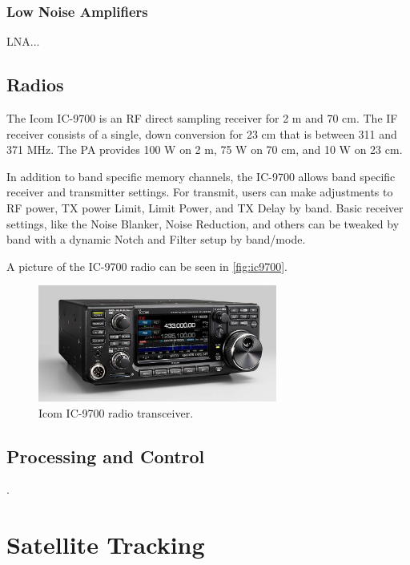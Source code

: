 \subsubsection{Low Noise Amplifiers}

LNA...

\subsection{Radios}

The Icom IC-9700 \cite{ic9700} is an RF direct sampling receiver for 2 m and 70 cm. The IF receiver consists of a single, down conversion for 23 cm that is between 311 and 371 MHz. The PA provides 100 W on 2 m, 75 W on 70 cm, and 10 W on 23 cm.

In addition to band specific memory channels, the IC-9700 allows band specific receiver and transmitter settings. For transmit, users can make adjustments to RF power, TX power Limit, Limit Power, and TX Delay by band. Basic receiver settings, like the Noise Blanker, Noise Reduction, and others can be tweaked by band with a dynamic Notch and Filter setup by band/mode.

A picture of the IC-9700 radio can be seen in \autoref{fig:ic9700}.

\begin{figure}[!ht]
    \begin{center}
        \includegraphics[width=0.7\textwidth]{figures/ic-9700.jpg}
        \caption{Icom IC-9700 radio transceiver.}
        \label{fig:ic9700}
    \end{center}
\end{figure}

\subsection{Processing and Control}

.

\section{Satellite Tracking}

